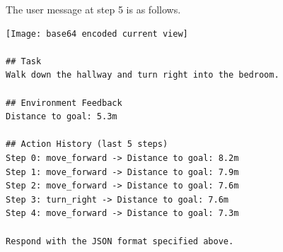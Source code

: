 The user message at step 5 is as follows.


\begin{lstlisting}[basicstyle=\ttfamily\small, numbers=none, backgroundcolor=\color{backcolour}]
[Image: base64 encoded current view]

## Task
Walk down the hallway and turn right into the bedroom.

## Environment Feedback
Distance to goal: 5.3m

## Action History (last 5 steps)
Step 0: move_forward -> Distance to goal: 8.2m
Step 1: move_forward -> Distance to goal: 7.9m
Step 2: move_forward -> Distance to goal: 7.6m
Step 3: turn_right -> Distance to goal: 7.6m
Step 4: move_forward -> Distance to goal: 7.3m

Respond with the JSON format specified above.
\end{lstlisting}
